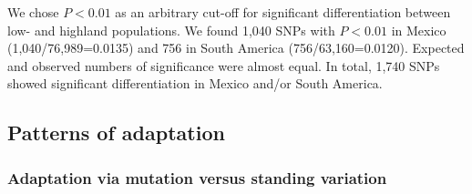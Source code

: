 We chose $P<0.01$ as an arbitrary cut-off for significant differentiation between low- and highland populations.  
We found 1,040 SNPs with $P<0.01$ in Mexico (1,040/76,989=0.0135) and 756 in South America (756/63,160=0.0120).  
Expected and observed numbers of significance were almost equal.  
In total, 1,740 SNPs showed significant differentiation in Mexico and/or South America.

\subsection*{Patterns of adaptation}

\subsubsection{Adaptation via mutation versus standing variation}

